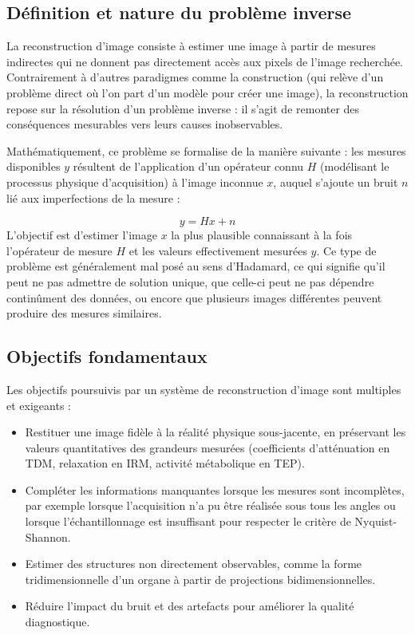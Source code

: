 \subsection{Définition et nature du problème inverse}
La reconstruction d'image consiste à estimer une image à partir de mesures indirectes qui ne donnent pas directement accès aux pixels de l'image recherchée. Contrairement à d'autres paradigmes comme la construction (qui relève d'un problème direct où l'on part d'un modèle pour créer une image), la reconstruction repose sur la résolution d'un problème inverse : il s'agit de remonter des conséquences mesurables vers leurs causes inobservables.

Mathématiquement, ce problème se formalise de la manière suivante : les mesures disponibles \( y \) résultent de l'application d'un opérateur connu \( H \) (modélisant le processus physique d'acquisition) à l'image inconnue \( x \), auquel s'ajoute un bruit \( n \) lié aux imperfections de la mesure :

\begin{equation} y = Hx + n \end{equation}
L'objectif est d'estimer l'image \( x \) la plus plausible connaissant à la fois l'opérateur de mesure \( H \) et les valeurs effectivement mesurées \( y \). Ce type de problème est généralement mal posé au sens d'Hadamard, ce qui signifie qu'il peut ne pas admettre de solution unique, que celle-ci peut ne pas dépendre continûment des données, ou encore que plusieurs images différentes peuvent produire des mesures similaires.

\subsection{Objectifs fondamentaux}

Les objectifs poursuivis par un système de reconstruction d'image sont multiples et exigeants :
\begin{itemize}[label=-]
 \item Restituer une image fidèle à la réalité physique sous-jacente, en préservant les valeurs quantitatives des grandeurs mesurées (coefficients d'atténuation en TDM, relaxation en IRM, activité métabolique en TEP).
 \item Compléter les informations manquantes lorsque les mesures sont incomplètes, par exemple lorsque l'acquisition n'a pu être réalisée sous tous les angles ou lorsque l'échantillonnage est insuffisant pour respecter le critère de Nyquist-Shannon.
 \item Estimer des structures non directement observables, comme la forme tridimensionnelle d'un organe à partir de projections bidimensionnelles.
 \item Réduire l'impact du bruit et des artefacts pour améliorer la qualité diagnostique.
\end{itemize}


